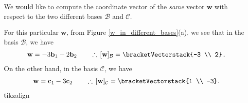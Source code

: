 \documentclass[a4paper,11pt]{book}
\theoremstyle{definition}
\newcommand{\ve}[1]{\mathbf{#1}}
\newcommand{\basis}[1]{{\mathcal #1}}
\newcommand{\cvector}[1]{\bracketVectorstack{#1}}
\begin{document}
We would like to compute the coordinate vector of the {\em same} vector $\ve{w}$ with respect to the two different bases $\basis{B}$ and $\basis{C}$. 

For this particular $\ve{w}$, from Figure \ref{w_in_different_bases}(a), we see that in the basis $\basis{B}$, we have
\begin{equation}
 \ve{w} = -3 \ve{b}_1 + 2 \ve{b}_2 \qquad \therefore \, [\ve{w}]_\basis{B} = \cvector{-3 \\ 2}  \,.
\end{equation}
On the other hand, in the basis $\basis{C}$, we have
\begin{equation}
 \ve{w} = \ve{c}_1 - 3\ve{c}_2 \qquad \therefore \, [\ve{w}]_\basis{C} = \cvector{1 \\ -3}. \label{correct_exp_w}
\end{equation}
tikzalign
\end{document}
